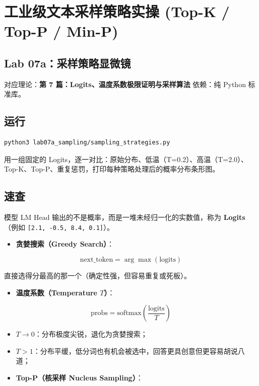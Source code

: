 \chapter{工业级文本采样策略实操 (Top-K / Top-P / Min-P)}

\section{Lab 07a：采样策略显微镜}

\begin{mathBox}[核心数学定理推导]
对应理论：\textbf{第 7 篇：Logits、温度系数极限证明与采样算法}
依赖：纯 Python 标准库。
\end{mathBox}

\section{运行}

\begin{lstlisting}[language=bash]
python3 lab07a_sampling/sampling_strategies.py
\end{lstlisting}

用一组固定的 Logits，逐一对比：原始分布、低温（T=0.2）、高温（T=2.0）、Top-K、Top-P、重复惩罚，打印每种策略处理后的概率分布条形图。

\section{速查}

模型 LM Head 输出的不是概率，而是一堆未经归一化的实数值，称为 \textbf{Logits}（例如 \texttt{[2.1, -0.5, 8.4, 0.1]}）。
\begin{itemize}
  \item \textbf{贪婪搜索（Greedy Search）}：
\end{itemize}

\[
\text{next\_token} = \arg\max(\text{logits})
\]

  直接选得分最高的那一个（确定性强，但容易重复或死板）。
\begin{itemize}
  \item \textbf{温度系数（Temperature $T$）}：
\end{itemize}

\[
\text{probs} = \text{softmax}\left(\frac{\text{logits}}{T}\right)
\]

\begin{itemize}
  \item $T \to 0$：分布极度尖锐，退化为贪婪搜索；
  \item $T > 1$：分布平缓，低分词也有机会被选中，回答更具创意但更容易胡说八道；
  \item \textbf{Top-P（核采样 Nucleus Sampling）}：
\end{itemize}

